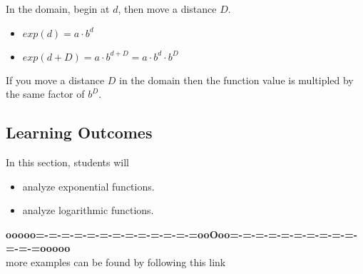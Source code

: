 \documentclass{ximera}
\begin{document}
\begin{procedure}

In the domain, begin at $d$, then move a distance $D$. \\

\begin{itemize}
\item $exp(d) = a \cdot b^d$
\item $exp(d+D) = a \cdot b^{d+D} = a \cdot b^d \cdot b^D$
\end{itemize}


If you move a distance $D$ in the domain then the function value is multipled by the same factor of $b^D$.






\end{procedure}


\subsection{Learning Outcomes}



\begin{sectionOutcomes}
In this section, students will 

\begin{itemize}
\item analyze exponential functions.
\item analyze logarithmic functions.
\end{itemize}
\end{sectionOutcomes}















\begin{center}
\textbf{\textcolor{green!50!black}{ooooo=-=-=-=-=-=-=-=-=-=-=-=-=ooOoo=-=-=-=-=-=-=-=-=-=-=-=-=ooooo}} \\

more examples can be found by following this link\\ 

\end{center}
\end{document}
